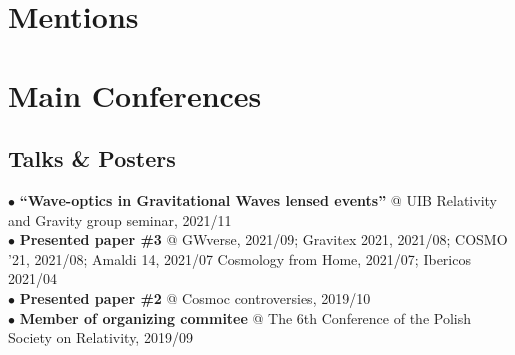 \documentclass[letterpaper]{twentysecondcv} %
\begin{document}
\section{Mentions}

\begin{twentyshort} %
\end{twentyshort}


\section{Main Conferences}
\subsection{Talks \& Posters}
\iffalse
\begin{itemize}
    \item \textbf{``Wave-optics in Gravitational Waves lensed events''} @ UIB Relativity and Gravity group seminar, 2021/11 
    \item \textbf{Presented paper \#3} @ GWverse, 2021/09; 
                                         Gravitex 2021, 2021/08;
                                         COSMO '21, 2021/08;
                                         Amaldi 14, 2021/07
                                         Cosmology from Home, 2021/07;
                                         Ibericos 2021/04
    \item \textbf{Presented paper \#2} @ Cosmoc controversies, 2019/10
    \item \textbf{Member of organizing commitee} @ The 6th Conference of the Polish Society on Relativity, 2019/09
\end{itemize}
\fi
$\bullet$ \textbf{``Wave-optics in Gravitational Waves lensed events''} @ UIB Relativity and Gravity group seminar, 2021/11\\
$\bullet$ \textbf{Presented paper \#3} @ GWverse, 2021/09; 
    Gravitex 2021, 2021/08;
    COSMO '21, 2021/08;
    Amaldi 14, 2021/07
    Cosmology from Home, 2021/07;
    Ibericos 2021/04
    \\
$\bullet$ \textbf{Presented paper \#2} @ Cosmoc controversies, 2019/10\\
$\bullet$ \textbf{Member of organizing commitee} @ The 6th Conference of the Polish Society on Relativity, 2019/09
\end{document}
